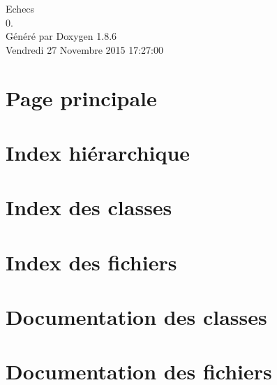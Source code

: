 \documentclass[twoside]{book}
\newcommand{\clearemptydoublepage}{%
  \newpage{\pagestyle{empty}\cleardoublepage}%
}
\begin{document}
\hypersetup{pageanchor=false}
\begin{titlepage}
\vspace*{7cm}
\begin{center}%
{\Large Echecs \\[1ex]\large 0. }\\
\vspace*{1cm}
{\large Généré par Doxygen 1.8.6}\\
\vspace*{0.5cm}
{\small Vendredi 27 Novembre 2015 17:27:00}\\
\end{center}
\end{titlepage}
\clearemptydoublepage
\tableofcontents
\clearemptydoublepage
{}
\hypersetup{pageanchor=true}

\chapter{Page principale}
\label{index}\hypertarget{index}{}
\chapter{Index hiérarchique}

\chapter{Index des classes}

\chapter{Index des fichiers}

\chapter{Documentation des classes}


























\chapter{Documentation des fichiers}



















\newpage
{}
{}
\printindex
\end{document}

